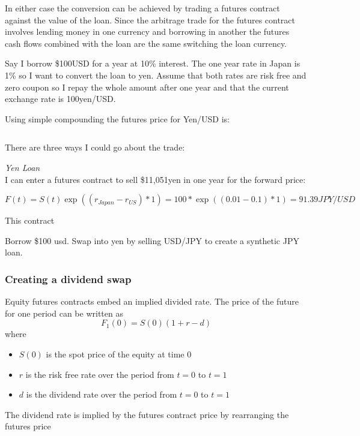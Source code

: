 \documentclass{tran-l}
\theoremstyle{definition}
\theoremstyle{remark}
\numberwithin{equation}{subsection}
\begin{document}
In either case the conversion can be achieved by trading a futures contract against the value of the loan. Since the arbitrage trade for the futures contract involves lending money in one currency and borrowing in another the futures cash flows combined with the loan are the same switching the loan currency.

Say I borrow \$100USD for a year at 10\% interest. The one year rate in Japan is 1\% so I want to convert the loan to yen.  Assume that both rates are risk free and zero coupon so I repay the whole amount after one year and that the current exchange rate is 100yen/USD. 

Using simple compounding the futures price for Yen/USD is:

\[  \]


There are three ways I could go about the trade:

\textit{Yen Loan}\\





I can enter a futures contract to sell  \$11,051yen in one year for the forward price:

\[F(t)= S(t)\exp((r_{Japan}-r_{US})*1) = 100 * \exp((0.01-0.1)*1) =  91.39 JPY/USD \]

This contract 

Borrow \$100 usd. Swap into yen by selling USD/JPY to create a synthetic JPY loan.

\subsubsection{Creating a dividend swap}

Equity futures contracts embed an implied divided rate. The price of the future for one period can be written as \[F_1(0) = S(0)(1+r-d) \] where 

\begin{itemize}
\item $S(0)$ is the spot price of the equity at time $0$
\item $r$ is the risk free rate over the period from $t=0$ to $t=1$
\item $d$ is the dividend rate over the period from $t=0$ to $t=1$
\end{itemize}

The dividend rate is implied by the futures contract price by rearranging the futures price
\end{document}
